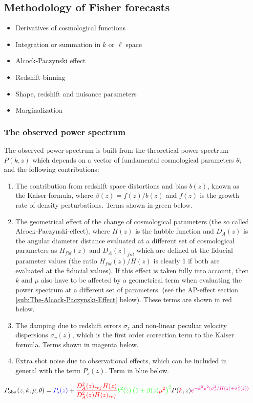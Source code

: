 \subsection{Methodology of Fisher forecasts}
\begin{itemize}
\item Derivatives of cosmological functions
\item Integration or summation in $k$ or $\ell$ space
\item Alcock-Paczynski effect
\item Redshift binning 
\item Shape, redshift and nuisance parameters
\item Marginalization
\end{itemize}



\subsubsection{The observed power spectrum}

The observed power spectrum is built from the theoretical power spectrum
$P(k,z)$ which depends on a vector of fundamental cosmological parameters
$\theta_{i}$ and the following contributions:
\begin{enumerate}
\item The contribution from redshift space distortions and bias $b(z)$,
known as the Kaiser formula, where $\beta(z)=f(z)/b(z)$ and $f(z)$
is the growth rate of density perturbations. Terms shown in green
below. 
\item The geometrical effect of the change of cosmological parameters (the
so called Alcock-Paczynski-effect), where $H(z)$ is the hubble function
and $D_{A}(z)$ is the angular diameter distance evaluated at a different
set of cosmological parameters as $H_{fid}(z)$ and $D_{A}(z)_{fid}$
which are defined at the fiducial parameter values (the ratio $H_{fid}(z)/H(z)$
is clearly 1 if both are evaluated at the fiducial values). If this
effect is taken fully into account, then $k$ and $\mu$ also have
to be affected by a geometrical term when evaluating the power spectrum
at a different set of parameters. (see the AP-effect section \ref{sub:The-Alcock-Paczynski-Effect}
below). These terms are shown in red below.
\item The damping due to redshift errors $\sigma_{z}$ and non-linear peculiar
velocity dispersions $\sigma_{v}(z)$, which is the first order correction
term to the Kaiser formula. Terms shown in magenta below. 
\item Extra shot noise due to observational effects, which can be included
in general with the term $P_{s}(z)$. Term in blue below.
\end{enumerate}
\begin{equation}
P_{{\rm obs}}\left(z,k,\mu;\theta\right)=\textcolor{blue}{P_{{\rm s}}(z)}+\textcolor{red}{\frac{D_{A}^{2}(z)_{ref}H(z)}{D_{A}^{2}(z)H(z)_{ref}}}{\color{green}b^{2}(z)\left(1+\beta(z){\color{red}\mu}^{{\color{red}2}}\right)^{2}}P({\color{red}k},z){\color{magenta}e^{-k^{2}\mu^{2}(\sigma_{z}^{2}/H(z)+\sigma_{v}^{2}(z))}}\label{eq:obs-power-basic}
\end{equation}


